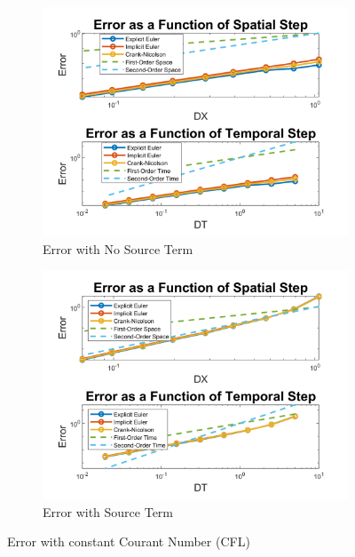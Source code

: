 \documentclass[10pt, letter, showtrims]{extarticle}
\begin{document}
		\FloatBarrier
		\begin{figure}[h]
			\captionsetup{justification=centering}
			\centering
			\begin{subfigure}{0.45\textwidth}
				\centering
				\captionsetup{justification=centering}
				\includegraphics[width=\linewidth]{"Figures/MATLAB/ConstantCFLNoSource"}
				\caption{Error with No Source Term}
				\label{fig:CFLnosource}
			\end{subfigure}
			\begin{subfigure}{0.45\textwidth}
				\centering
				\captionsetup{justification=centering}
				\includegraphics[width=\linewidth]{"Figures/MATLAB/ConstantCFLSource"}
				\caption{Error with Source Term}
				\label{fig:CFLsource}
			\end{subfigure}
			\caption{Error with constant Courant Number (CFL)}
			\label{fig:CFL}
		\end{figure}
		\FloatBarrier
		
\end{document}
